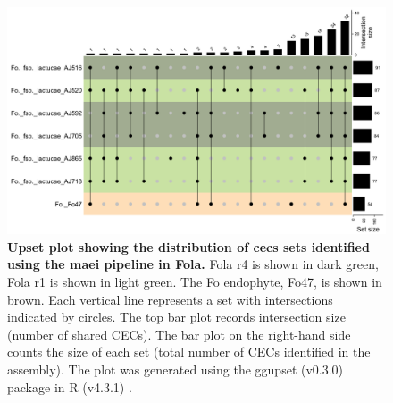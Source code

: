 
\begin{figure}
    \centering
    \includegraphics[width=\textwidth]{Figures/UpSetCECofFola.png}
    \captionsetup{width = 22cm}
    \caption[Upset plot of \ac{cec} distribution between \ac{Fola}.]{\textbf{Upset plot showing the distribution of \acp{cec} sets identified using the \ac{maei} pipeline in \ac{Fola}.}
    \ac{Fola} \ac{r4} is shown in dark green,  \ac{Fola} \ac{r1} is shown in light green. The \ac{Fo} endophyte, Fo47, is shown in brown. Each vertical line represents a set with intersections indicated by circles. The top bar plot records intersection size (number of shared CECs). The bar plot on the right-hand side counts the size of each set (total number of CECs identified in the assembly). The plot was generated using the ggupset (v0.3.0) \parencite{ggupset} package in R (v4.3.1) \parencite{R}.}
    \label{fig:UpSetCECofFola}
\end{figure}


